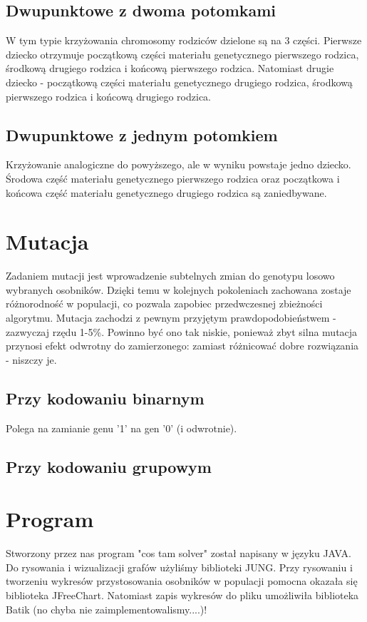 \documentclass[11pt]{aghdpl}
\begin{document}
\section{Dwupunktowe z dwoma potomkami}
\label{sec:dwaDwa}
W tym typie krzyżowania chromosomy rodziców dzielone są na 3 części. Pierwsze dziecko otrzymuje początkową części materiału genetycznego pierwszego rodzica, środkową drugiego rodzica i końcową pierwszego rodzica. Natomiast drugie dziecko - początkową części materiału genetycznego drugiego rodzica, środkową pierwszego rodzica i końcową drugiego rodzica.

\section{Dwupunktowe z jednym potomkiem}
\label{sec:dwaJeden}
Krzyżowanie analogiczne do powyższego, ale w wyniku powstaje jedno dziecko. Środowa część materiału genetycznego pierwszego rodzica oraz początkowa i końcowa część materiału genetycznego drugiego rodzica są zaniedbywane.

\chapter{Mutacja}
\label{cha:mutation}
Zadaniem mutacji jest wprowadzenie subtelnych zmian do genotypu losowo wybranych osobników. Dzięki temu w kolejnych pokoleniach zachowana zostaje różnorodność w populacji, co pozwala zapobiec przedwczesnej zbieżności algorytmu. Mutacja zachodzi z pewnym przyjętym prawdopodobieństwem - zazwyczaj rzędu 1-5\%. Powinno być ono tak niskie, ponieważ zbyt silna mutacja przynosi efekt odwrotny do zamierzonego: zamiast różnicować dobre rozwiązania - niszczy je.

\section{Przy kodowaniu binarnym}
\label{sec:kodBin}
Polega na zamianie genu '1' na gen '0' (i odwrotnie).
\section{Przy kodowaniu grupowym}
\label{sec:kodGru}

\chapter{Program}
\label{cha:program}
Stworzony przez nas program "cos tam solver" został napisany w języku JAVA. Do rysowania i wizualizacji grafów użyliśmy biblioteki JUNG. Przy rysowaniu i tworzeniu wykresów przystosowania osobników w populacji pomocna okazała się biblioteka JFreeChart. Natomiast zapis wykresów do pliku umożliwiła biblioteka Batik (no chyba nie zaimplementowalismy....)!
\end{document}
